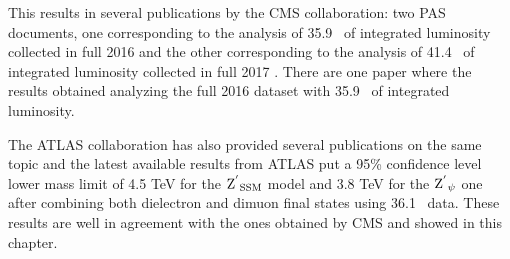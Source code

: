 This results in several publications by the CMS collaboration: two PAS documents, one corresponding to the analysis of 35.9 \fbinv\ of integrated luminosity collected in full 2016 \cite{CMS-PAS-EXO-16-047} and the other corresponding to the analysis of 41.4 \fbinv\ of integrated luminosity collected in full 2017 \cite{CMS-PAS-EXO-18-006}. There are one paper \cite{Sirunyan2018} where the results obtained analyzing the full 2016 dataset with 35.9 \fbinv\ of integrated luminosity.

The ATLAS collaboration has also provided several publications on the same topic and the latest available results from ATLAS \cite{ATLAS-CONF-2017-027} put a 95\% confidence level lower mass limit of 4.5 TeV for the $\mathrm{Z^{'}}_\mathrm{SSM}$ model and 3.8 TeV for the $\mathrm{Z^{'}}_\mathrm{\psi}$ one after combining both dielectron and dimuon final states using 36.1 \fbinv\ data. These results are well in agreement with the ones obtained by CMS and showed in this chapter.  